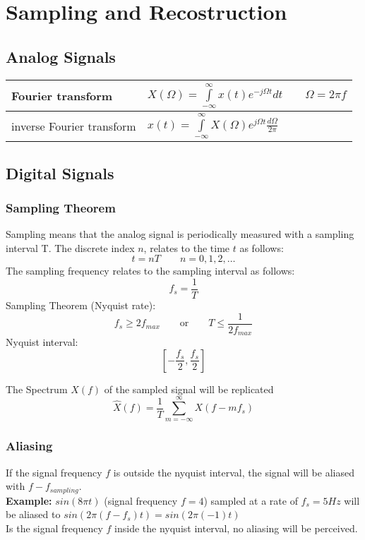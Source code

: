 \section{Sampling and Recostruction}
\subsection{Analog Signals}
\begin{tabularx}{\linewidth}{|l|X|}
	\hline
	Fourier transform & $X(\Omega) = \int\limits_{-\infty}^{\infty} x(t)e^{-j\Omega t}dt \qquad \Omega = 2\pi f $ \\
	\hline
	inverse Fourier transform & $ x(t) = \int\limits_{-\infty}^{\infty} X(\Omega)e^{j\Omega t} \frac{d\Omega}{2 \pi} $ \\
	\hline
\end{tabularx}

\subsection{Digital Signals}
\subsubsection{Sampling Theorem}
Sampling means that the analog signal is periodically measured with a sampling interval T. The discrete index $n$, relates to
the time $t$ as follows:
\[ t = nT \qquad n = 0,1,2,\ldots \]
The sampling frequency relates to the sampling interval as follows:
\[ f_s = \frac{1}{T} \]
Sampling Theorem (Nyquist rate):
\[ f_s \geq 2f_{max} \qquad \text{or} \qquad T \leq \frac{1}{2f_{max}} \]
Nyquist interval:
\[ \left[-\frac{f_s}{2}, \frac{f_s}{2}\right] \]

The Spectrum ${X}(f)$ of the sampled signal will be replicated
\[ \hat{X}(f) = \frac{1}{T} \sum_{m=-\infty}^{\infty}X(f-m f_s)\]
\subsubsection{Aliasing}
If the signal frequency $f$ is outside the nyquist interval, the signal will be
aliased with $f - f_{sampling}$.\\
\textbf{Example:} $sin(8\pi t)$ (signal frequency $f=4$) sampled at a rate of
$f_s=5Hz$ will be aliased to $sin(2\pi (f-f_s) t) = sin(2\pi (-1) t)$\\

Is the signal frequency $f$ inside the nyquist interval, no aliasing will be
perceived.
